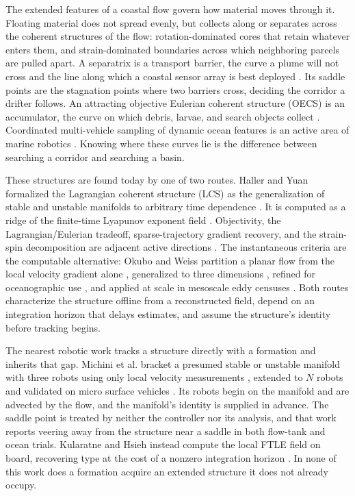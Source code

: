 \documentclass[lettersize,journal]{IEEEtran}
\begin{document}
The extended features of a coastal flow govern how material moves
through it. Floating material does not spread evenly, but collects along or separates across
the coherent structures of the flow: rotation-dominated cores that
retain whatever enters them, and strain-dominated boundaries across
which neighboring parcels are pulled apart. A separatrix is a transport
barrier, the curve a plume will not cross and the line along which a
coastal sensor array is best deployed \cite{9,10,11}. Its saddle points
are the stagnation points where two barriers cross, deciding the
corridor a drifter follows. An attracting objective Eulerian
coherent structure (OECS) is an accumulator, the curve on which debris,
larvae, and search objects collect \cite{12}. Coordinated multi-vehicle sampling of dynamic ocean features is an
active area of marine robotics \cite{13,14,15}. Knowing where these curves lie is the
difference between searching a corridor and searching a basin.

These structures are found today by one of two routes. Haller and Yuan
formalized the Lagrangian coherent structure (LCS) as the
generalization of stable and unstable manifolds to arbitrary time
dependence \cite{9}. It is computed as a ridge of the finite-time
Lyapunov exponent field \cite{11}. Objectivity, the Lagrangian/Eulerian tradeoff, sparse-trajectory gradient recovery, and the strain-spin decomposition are adjacent active directions \cite{16,17,18,19,20}. The
instantaneous criteria are the computable alternative: Okubo and Weiss
partition a planar flow from the local velocity gradient alone
\cite{21,22}, generalized to three dimensions \cite{23}, refined for
oceanographic use \cite{24}, and applied at scale in mesoscale eddy
censuses \cite{25}. Both routes characterize the structure offline from a reconstructed
field, depend on an integration horizon that delays estimates, and
assume the structure's identity before tracking begins.

The nearest robotic work tracks a structure directly with a formation
and inherits that gap. Michini et al. bracket a presumed stable or
unstable manifold with three robots using only local velocity
measurements \cite{26}, extended to $N$ robots \cite{27} and validated
on micro surface vehicles \cite{28,29}. Its robots begin on the
manifold and are advected by the flow, and the manifold's identity is
supplied in advance. The saddle point is treated by neither the
controller nor its analysis, and that work reports veering away from
the structure near a saddle in both flow-tank and ocean trials. Kularatne
and Hsieh instead compute the local FTLE field on board, recovering
type at the cost of a nonzero integration horizon \cite{30}. In none of
this work does a formation acquire an extended structure it does not
already occupy.
\end{document}
